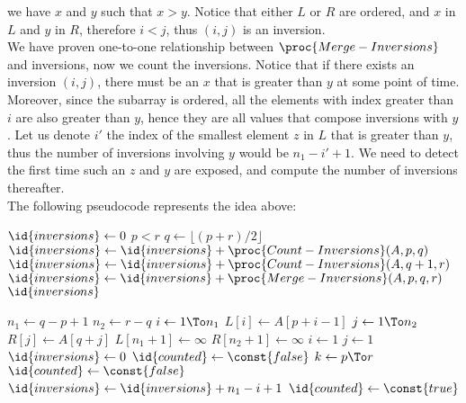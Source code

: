 \begin{enumerate}[leftmargin=*]
        we have $x$ and $y$ such that $x>y$. Notice that either $L$ or $R$ are
        ordered, and $x$ in $L$ and $y$ in $R$, therefore $i<j$, thus $(i,j)$
        is an inversion. \\
        We have proven one-to-one relationship between $\proc{Merge-Inversions}$
        and inversions, now we count the inversions. Notice that if there
        exists an inversion $(i,j)$, there must be an $x$ that is greater than
        $y$ at some point of time. Moreover, since the subarray is ordered,
        all the elements with index greater than $i$ are also greater than $y$,
        hence they are all values that compose inversions with $y$. Let us
        denote $i'$ the index of the smallest element $z$ in $L$ that is
        greater than $y$, thus the number of inversions involving $y$ would be
        $n_1-i'+1$. We need to detect the first time such an $z$ and $y$ are
        exposed, and compute the number of inversions thereafter. \\
        The following pseudocode represents the idea above:
        \begin{codebox}
        \li $\id{inversions}\gets 0$
        \li \If $p<r$
            \Then
        \li     $q\gets\lfloor(p+r)/2\rfloor$
        \li     $\id{inversions}\gets\id{inversions}
                +\proc{Count-Inversions}(A,p,q)$
        \li     $\id{inversions}\gets\id{inversions}
                +\proc{Count-Inversions}(A,q+1,r)$
        \li     $\id{inversions}\gets\id{inversions}
                +\proc{Merge-Inversions}(A,p,q,r)$
            \End
        \li {} $\id{inversions}$
        \end{codebox}
        \begin{codebox}
        \li $n_1\gets q-p+1$
        \li $n_2\gets r-q$
        \li \For $i\gets 1\To n_1$
            \Do
        \li     $L[i]\gets A[p+i-1]$
            \End
        \li \For $j\gets 1\To n_2$
            \Do
        \li     $R[j]\gets A[q+j]$
            \End
        \li $L[n_1+1]\gets \infty$
        \li $R[n_2+1]\gets \infty$
        \li $i\gets 1$
        \li $j\gets 1$
        \li $\id{inversions}\gets 0$
        \li $\id{counted}\gets \const{false}$
        \li \For $k\gets p\To r$
            \Do
        \li     \If $\id{counted}\gets \const{false}$
                \Then
        \li         $\id{inversions}\gets\id{inversions}
                    +n_1-i+1$
        \li         $\id{counted}\gets \const{true}$

\end{codebox}
\end{enumerate}
